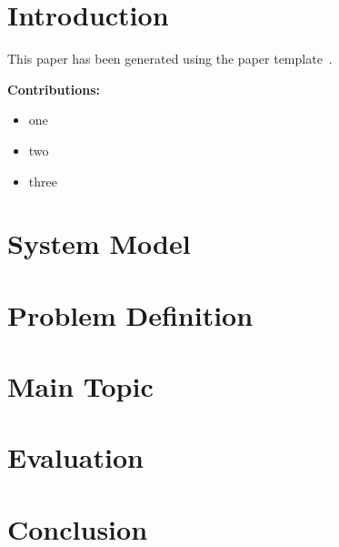 \documentclass[conference]{IEEEtran}
\theoremstyle{definition}
\theoremstyle{remark}
\begin{document}


\section{Introduction}
\label{sec:introduction}

This paper has been generated using the paper template~\cite{papertemplate}.




\noindent\textbf{Contributions:} %
\begin{itemize}
    \item one
    \item two
    \item three
\end{itemize}
	
	
\section{System Model}
\label{sec:system_model}

\section{Problem Definition}
\label{sec:problem_def}

\section{Main Topic}

\section{Evaluation}
\label{sec:evaluation}
	

\section{Conclusion}
\label{sec:conclusion}
	
\label{last-page}
\clearpage
\end{document}
